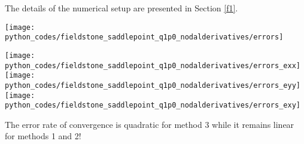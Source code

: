 The details of the numerical setup are presented in Section \ref{f1}.




\begin{center}
\texttt{[image: python\_codes/fieldstone\_saddlepoint\_q1p0\_nodalderivatives/errors]}
\end{center}

\begin{center}
\texttt{[image: python\_codes/fieldstone\_saddlepoint\_q1p0\_nodalderivatives/errors\_exx]}
\texttt{[image: python\_codes/fieldstone\_saddlepoint\_q1p0\_nodalderivatives/errors\_eyy]}
\texttt{[image: python\_codes/fieldstone\_saddlepoint\_q1p0\_nodalderivatives/errors\_exy]}
\end{center}
The error rate of convergence is quadratic for method 3 while it remains linear for methods 1 and 2!
